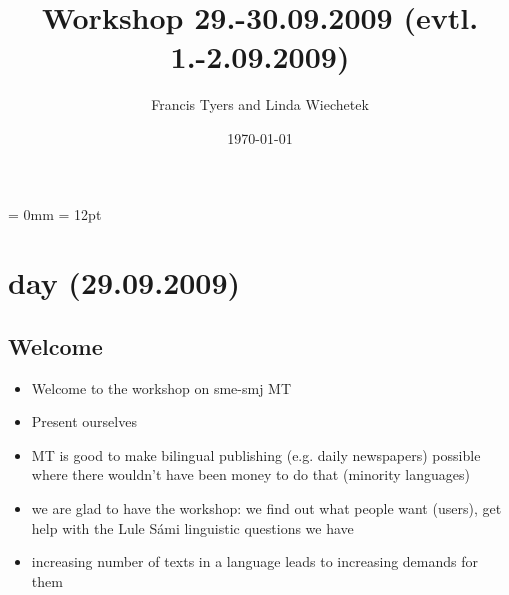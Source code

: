 \documentclass[a4paper,english,12pt]{article}
\begin{document}
\setcounter{secnumdepth}{3}
\setcounter{tocdepth}{3}
\begin{spacing}{1.0}


\newcommand{\tx}{\mbox{t\hspace{-.35em}-}} %




\title{{\Large Workshop 29.-30.09.2009 (evtl. 1.-2.09.2009)}}

\author{Francis Tyers and Linda Wiechetek}
\date{\today}
\maketitle


\thispagestyle{empty}
\tableofcontents 
\thispagestyle{empty} %

\newpage

\setcounter{page}{1} %

\parindent = 0mm
\parskip = 12pt




\section{day (29.09.2009)}
\subsection{Welcome}
\begin{itemize}
\item Welcome to the workshop on sme-smj MT
\item Present ourselves
\item MT is good to make bilingual publishing (e.g. daily newspapers) possible where there wouldn't have been money to do that (minority languages)
\item we are glad to have the workshop: we find out what people want (users), get help with the Lule Sámi linguistic questions we have
\item increasing number of texts in a language leads to increasing demands for them
\end{itemize}


\end{spacing}
\end{document}
